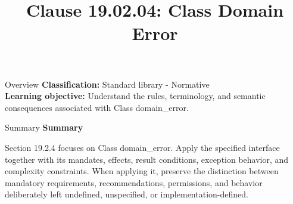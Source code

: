 \documentclass[10pt,letterpaper]{article}
\title{Clause 19.02.04: Class Domain Error}
\author{}
\date{}
\begin{document}
\maketitle
\begin{CornellOverviewBox}{Overview}
\textbf{Classification:} Standard library - Normative\\[2pt]
\textbf{Learning objective:} Understand the rules, terminology, and semantic consequences associated with Class domain\_error.
\end{CornellOverviewBox}\begin{CornellSummaryBox}{Summary}
{\sffamily\bfseries\color{Accent} Summary}\par\vspace{3pt}Section 19.2.4 focuses on Class domain\_error. Apply the specified interface together with its mandates, effects, result conditions, exception behavior, and complexity constraints. When applying it, preserve the distinction between mandatory requirements, recommendations, permissions, and behavior deliberately left undefined, unspecified, or implementation-defined.
\end{CornellSummaryBox}
\end{document}
